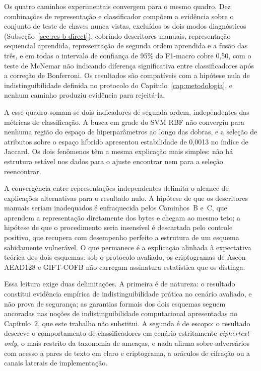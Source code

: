 Os quatro caminhos experimentais convergem para o mesmo quadro. Dez combinações de representação e classificador compõem a evidência sobre o conjunto de teste de chaves nunca vistas, excluídos os dois modos diagnósticos (Subseção~\ref{sec:res-b-direct}), cobrindo descritores manuais, representação sequencial aprendida, representação de segunda ordem aprendida e a fusão das três, e em todas o intervalo de confiança de 95\% do F1-macro cobre 0,50, com o teste de McNemar não indicando diferença significativa entre classificadores após a correção de Bonferroni. Os resultados são compatíveis com a hipótese nula de indistinguibilidade definida no protocolo do Capítulo~\ref{cap:metodologia}, e nenhum caminho produziu evidência para rejeitá-la.

A esse quadro somam-se dois indicadores de segunda ordem, independentes das métricas de classificação. A busca em grade do SVM RBF não convergiu para nenhuma região do espaço de hiperparâmetros ao longo das dobras, e a seleção de atributos sobre o espaço híbrido apresentou estabilidade de 0,0013 no índice de Jaccard. Os dois fenômenos têm a mesma explicação mais simples: não há estrutura estável nos dados para o ajuste encontrar nem para a seleção reencontrar.

A convergência entre representações independentes delimita o alcance de explicações alternativas para o resultado nulo. A hipótese de que os descritores manuais seriam inadequados é enfraquecida pelos Caminhos~B e~C, que aprendem a representação diretamente dos bytes e chegam ao mesmo teto; a hipótese de que o procedimento seria insensível é descartada pelo controle positivo, que recupera com desempenho perfeito a estrutura de um esquema sabidamente vulnerável. O que permanece é a explicação alinhada à expectativa teórica dos dois esquemas: sob o protocolo avaliado, os criptogramas de Ascon-AEAD128 e GIFT-COFB não carregam assinatura estatística que os distinga.

Essa leitura exige duas delimitações. A primeira é de natureza: o resultado constitui evidência empírica de indistinguibilidade prática no cenário avaliado, e não prova de segurança; as garantias formais dos dois esquemas seguem ancoradas nas noções de indistinguibilidade computacional apresentadas no Capítulo~2, que este trabalho não substitui. A segunda é de escopo: o resultado descreve o comportamento de classificadores em cenário estritamente \textit{ciphertext-only}, o mais restrito da taxonomia de ameaças, e nada afirma sobre adversários com acesso a pares de texto em claro e criptograma, a oráculos de cifração ou a canais laterais de implementação.

